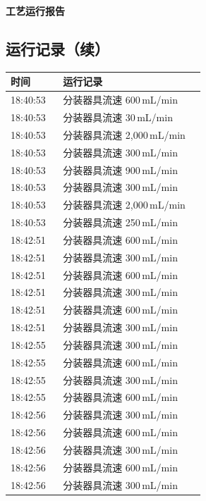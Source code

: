 \documentclass[UTF8,10pt,a4paper,fontset=fandol]{ctexart}
\begin{document}
\vspace{1em}

\begin{center}
\begin{minipage}[t]{0.47\linewidth}
\centering
\textbf{工艺运行报告}

\subsection*{运行记录（续）}

\begin{tabular}{|p{0.25\linewidth}|p{0.68\linewidth}|}
\hline
时间 & 运行记录 \\ \hline
18:40:53 & 分装器具流速 600\,mL/min \\ \hline
18:40:53 & 分装器具流速 30\,mL/min \\ \hline
18:40:53 & 分装器具流速 2,000\,mL/min \\ \hline
18:40:53 & 分装器具流速 300\,mL/min \\ \hline
18:40:53 & 分装器具流速 900\,mL/min \\ \hline
18:40:53 & 分装器具流速 300\,mL/min \\ \hline
18:40:53 & 分装器具流速 2,000\,mL/min \\ \hline
18:40:53 & 分装器具流速 250\,mL/min \\ \hline
18:42:51 & 分装器具流速 600\,mL/min \\ \hline
18:42:51 & 分装器具流速 300\,mL/min \\ \hline
18:42:51 & 分装器具流速 600\,mL/min \\ \hline
18:42:51 & 分装器具流速 300\,mL/min \\ \hline
18:42:51 & 分装器具流速 600\,mL/min \\ \hline
18:42:51 & 分装器具流速 300\,mL/min \\ \hline
18:42:55 & 分装器具流速 300\,mL/min \\ \hline
18:42:55 & 分装器具流速 600\,mL/min \\ \hline
18:42:55 & 分装器具流速 300\,mL/min \\ \hline
18:42:55 & 分装器具流速 600\,mL/min \\ \hline
18:42:56 & 分装器具流速 300\,mL/min \\ \hline
18:42:56 & 分装器具流速 600\,mL/min \\ \hline
18:42:56 & 分装器具流速 300\,mL/min \\ \hline
18:42:56 & 分装器具流速 600\,mL/min \\ \hline
18:42:56 & 分装器具流速 300\,mL/min \\ \hline
\end{tabular}


\end{minipage}
\end{center}
\end{document}
